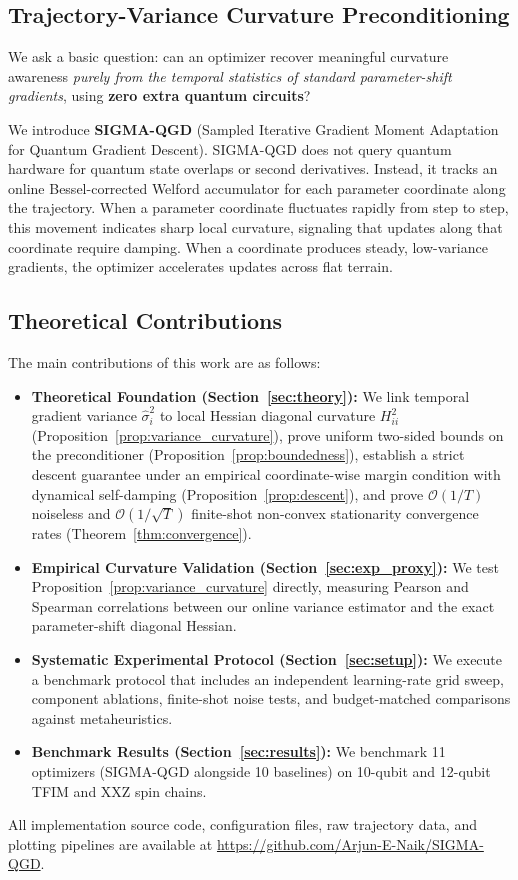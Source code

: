 \documentclass[11pt,a4paper]{article}
\begin{document}
\subsection{Trajectory-Variance Curvature Preconditioning}
We ask a basic question: can an optimizer recover meaningful curvature awareness \emph{purely from the temporal statistics of standard parameter-shift gradients}, using \textbf{zero extra quantum circuits}?

We introduce \textbf{SIGMA-QGD} (Sampled Iterative Gradient Moment Adaptation for Quantum Gradient Descent). SIGMA-QGD does not query quantum hardware for quantum state overlaps or second derivatives. Instead, it tracks an online Bessel-corrected Welford accumulator for each parameter coordinate along the trajectory. When a parameter coordinate fluctuates rapidly from step to step, this movement indicates sharp local curvature, signaling that updates along that coordinate require damping. When a coordinate produces steady, low-variance gradients, the optimizer accelerates updates across flat terrain.

\subsection{Theoretical Contributions}
The main contributions of this work are as follows:
\begin{itemize}
    \item \textbf{Theoretical Foundation (Section~\ref{sec:theory}):} We link temporal gradient variance $\hat{\sigma}_i^2$ to local Hessian diagonal curvature $H_{ii}^2$ (Proposition~\ref{prop:variance_curvature}), prove uniform two-sided bounds on the preconditioner (Proposition~\ref{prop:boundedness}), establish a strict descent guarantee under an empirical coordinate-wise margin condition with dynamical self-damping (Proposition~\ref{prop:descent}), and prove $\mathcal{O}(1/T)$ noiseless and $\mathcal{O}(1/\sqrt{T})$ finite-shot non-convex stationarity convergence rates (Theorem~\ref{thm:convergence}).
    \item \textbf{Empirical Curvature Validation (Section~\ref{sec:exp_proxy}):} We test Proposition~\ref{prop:variance_curvature} directly, measuring Pearson and Spearman correlations between our online variance estimator and the exact parameter-shift diagonal Hessian.
    \item \textbf{Systematic Experimental Protocol (Section~\ref{sec:setup}):} We execute a benchmark protocol that includes an independent learning-rate grid sweep, component ablations, finite-shot noise tests, and budget-matched comparisons against metaheuristics.
    \item \textbf{Benchmark Results (Section~\ref{sec:results}):} We benchmark 11 optimizers (SIGMA-QGD alongside 10 baselines) on 10-qubit and 12-qubit TFIM and XXZ spin chains.
\end{itemize}
All implementation source code, configuration files, raw trajectory data, and plotting pipelines are available at \url{https://github.com/Arjun-E-Naik/SIGMA-QGD}.
\end{document}
